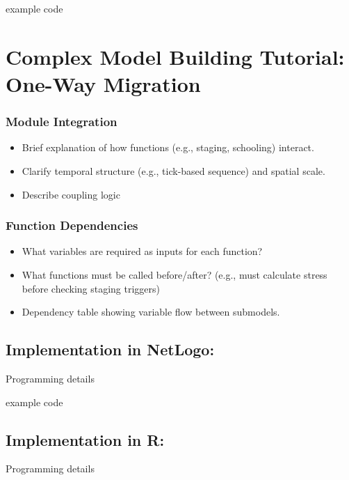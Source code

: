 \documentclass[
]{book}
\providecommand{\tightlist}{%
  \setlength{\itemsep}{0pt}\setlength{\parskip}{0pt}}
\begin{document}
example code

\chapter{Complex Model Building Tutorial: One-Way Migration}\label{complex-model-building-tutorial-one-way-migration}

\subsection{Module Integration}\label{module-integration-2}

\begin{itemize}
\tightlist
\item
  Brief explanation of how functions (e.g., staging, schooling) interact.
\item
  Clarify temporal structure (e.g., tick-based sequence) and spatial scale.
\item
  Describe coupling logic
\end{itemize}

\subsection{Function Dependencies}\label{function-dependencies-2}

\begin{itemize}
\item
  What variables are required as inputs for each function?
\item
  What functions must be called before/after? (e.g., must calculate stress before checking staging triggers)
\item
  Dependency table showing variable flow between submodels.
\end{itemize}

\section{Implementation in NetLogo:}\label{implementation-in-netlogo-2}

Programming details

example code

\section{Implementation in R:}\label{implementation-in-r-2}

Programming details
\end{document}
